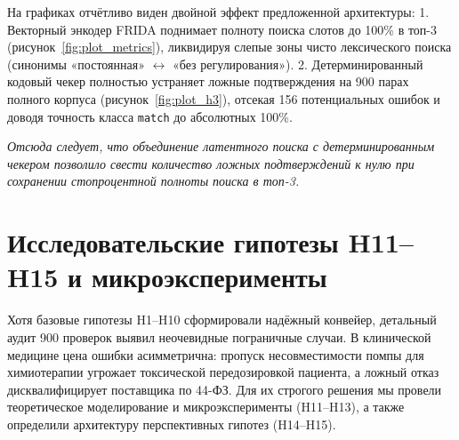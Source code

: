 \documentclass[10pt,a4paper]{article}
\begin{document}
На графиках отчётливо виден двойной эффект предложенной архитектуры:
1. Векторный энкодер FRIDA поднимает полноту поиска слотов до 100\% в топ-3 (рисунок~\ref{fig:plot_metrics}), ликвидируя слепые зоны чисто лексического поиска (синонимы «постоянная» $\leftrightarrow$ «без регулирования»).
2. Детерминированный кодовый чекер полностью устраняет ложные подтверждения на 900 парах полного корпуса (рисунок~\ref{fig:plot_h3}), отсекая 156 потенциальных ошибок и доводя точность класса \texttt{match} до абсолютных 100\%.

\emph{Отсюда следует, что объединение латентного поиска с детерминированным чекером позволило свести количество ложных подтверждений к нулю при сохранении стопроцентной полноты поиска в топ-3.}

\newpage
\section{Исследовательские гипотезы H11--H15 и микроэксперименты}

Хотя базовые гипотезы H1--H10 сформировали надёжный конвейер, детальный аудит 900 проверок выявил неочевидные пограничные случаи. В клинической медицине цена ошибки асимметрична: пропуск несовместимости помпы для химиотерапии угрожает токсической передозировкой пациента, а ложный отказ дисквалифицирует поставщика по 44-ФЗ. Для их строгого решения мы провели теоретическое моделирование и микроэксперименты (H11--H13), а также определили архитектуру перспективных гипотез (H14--H15).
\end{document}
